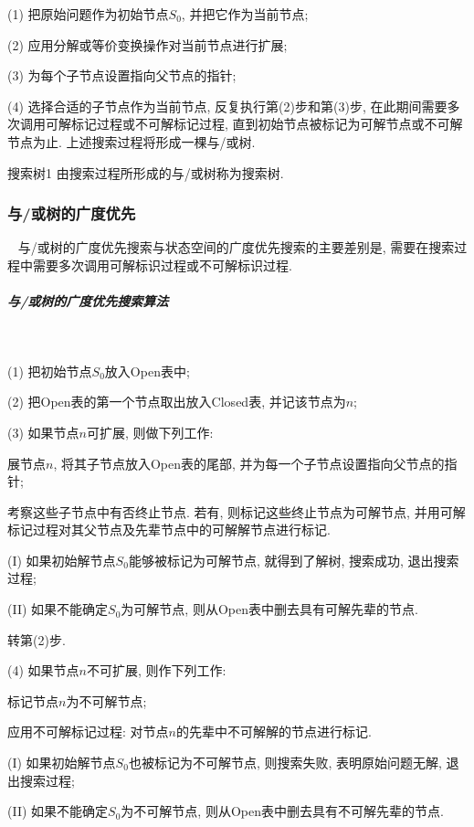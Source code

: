 (1) 把原始问题作为初始节点$S_0$, 并把它作为当前节点;

(2) 应用分解或等价变换操作对当前节点进行扩展;

(3) 为每个子节点设置指向父节点的指针;

(4) 选择合适的子节点作为当前节点, 反复执行第(2)步和第(3)步, 在此期间需要多次调用可解标记过程或不可解标记过程, 直到初始节点被标记为可解节点或不可解节点为止.
上述搜索过程将形成一棵与/或树.

\begin{mydef}{搜索树}{1}
    由搜索过程所形成的与/或树称为搜索树.
\end{mydef}
\subsubsection{与/或树的广度优先}~{}
    与/或树的广度优先搜索与状态空间的广度优先搜索的主要差别是, 需要在搜索过程中需要多次调用可解标识过程或不可解标识过程.
\subparagraph{与/或树的广度优先搜索算法}~{}

(1) 把初始节点$S_0$放入Open表中;

(2) 把Open表的第一个节点取出放入Closed表, 并记该节点为$n$;

(3) 如果节点$n$可扩展, 则做下列工作:

   \qquad {} 展节点$n$, 将其子节点放入Open表的尾部, 并为每一个子节点设置指向父节点的指针;

   \qquad {}  考察这些子节点中有否终止节点. 若有, 则标记这些终止节点为可解节点, 并用可解标记过程对其父节点及先辈节点中的可解解节点进行标记.

     \qquad\qquad (I)  如果初始解节点$S_0$能够被标记为可解节点, 就得到了解树, 搜索成功, 退出搜索过程;

     \qquad\qquad (II)  如果不能确定$S_0$为可解节点, 则从Open表中删去具有可解先辈的节点.

   \qquad{} 转第(2)步.

(4) 如果节点$n$不可扩展, 则作下列工作:

   \qquad  {} 标记节点$n$为不可解节点;

   \qquad  {} 应用不可解标记过程: 对节点$n$的先辈中不可解解的节点进行标记.

   \qquad\qquad (I)  如果初始解节点$S_0$也被标记为不可解节点, 则搜索失败, 表明原始问题无解, 退出搜索过程;

   \qquad\qquad (II) 如果不能确定$S_0$为不可解节点, 则从Open表中删去具有不可解先辈的节点.

